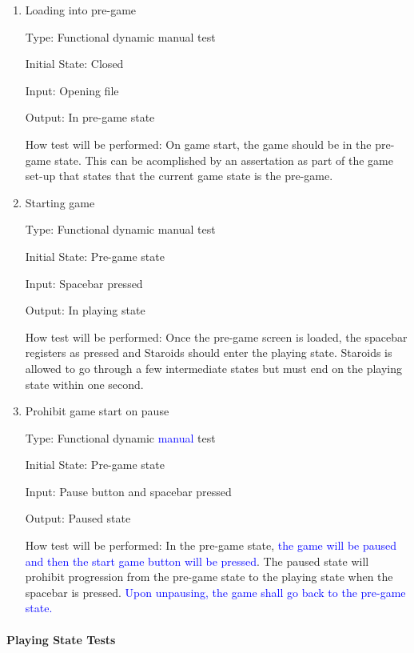 \documentclass[12pt, titlepage]{article}
\begin{document}
\begin{enumerate}

\item{Loading into pre-game\\}

Type: Functional dynamic manual test

Initial State: Closed

Input: Opening file

Output: In pre-game state

How test will be performed: On game start, the game should be in the pre-game state. This can be acomplished by an assertation as part of the game set-up that states that the current game state is the pre-game.

\item{Starting game\\}

Type: Functional dynamic manual test

Initial State: Pre-game state

Input: Spacebar pressed

Output: In playing state

How test will be performed: Once the pre-game screen is loaded, the spacebar registers as pressed and Staroids should enter the playing state. Staroids is allowed to go through a few intermediate states but must end on the playing state within one second.

\item{Prohibit game start on pause\\}

Type: Functional dynamic \textcolor{blue}{manual} test

Initial State: Pre-game state

Input: Pause button and spacebar pressed

Output: Paused state

How test will be performed: In the pre-game state, \textcolor{blue}{the game will be paused and then the start game button will be pressed}. The paused state will prohibit progression from the pre-game state to the playing state when the spacebar is pressed. \textcolor{blue}{Upon unpausing, the game shall go back to the pre-game state.}

\end{enumerate}

\paragraph{Playing State Tests}
\end{document}
